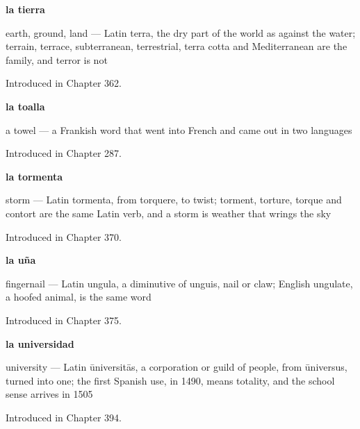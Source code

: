 \noindent\begin{minipage}[t]{\linewidth}
\raggedright
\textbf{la tierra}\par
\small earth, ground, land — Latin terra, the dry part of the world as against the water; terrain, terrace, subterranean, terrestrial, terra cotta and Mediterranean are the family, and terror is not\par
\footnotesize Introduced in Chapter 362.
\end{minipage}\par\medskip

\noindent\begin{minipage}[t]{\linewidth}
\raggedright
\textbf{la toalla}\par
\small a towel — a Frankish word that went into French and came out in two languages\par
\footnotesize Introduced in Chapter 287.
\end{minipage}\par\medskip

\noindent\begin{minipage}[t]{\linewidth}
\raggedright
\textbf{la tormenta}\par
\small storm — Latin tormenta, from torquere, to twist; torment, torture, torque and contort are the same Latin verb, and a storm is weather that wrings the sky\par
\footnotesize Introduced in Chapter 370.
\end{minipage}\par\medskip

\noindent\begin{minipage}[t]{\linewidth}
\raggedright
\textbf{la uña}\par
\small fingernail — Latin ungula, a diminutive of unguis, nail or claw; English ungulate, a hoofed animal, is the same word\par
\footnotesize Introduced in Chapter 375.
\end{minipage}\par\medskip

\noindent\begin{minipage}[t]{\linewidth}
\raggedright
\textbf{la universidad}\par
\small university — Latin ūniversitās, a corporation or guild of people, from ūniversus, turned into one; the first Spanish use, in 1490, means totality, and the school sense arrives in 1505\par
\footnotesize Introduced in Chapter 394.
\end{minipage}\par\medskip


